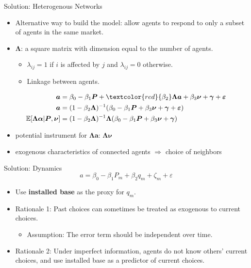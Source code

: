 \documentclass[aspectratio=169]{beamer}  %
\begin{document}
\begin{frame}{Solution: Heterogenous Networks}
    \vspace{-0.1cm}
    \begin{itemize}
        \item Alternative way to build the model: allow agents to respond to only a subset of agents in the same market.
        \item $\bm{\Lambda}$: a square matrix with dimension equal to
        the number of agents.
        \begin{itemize}
            \item $\lambda_{ij}= 1$ if $i$ is affected by $j$ and $\lambda_{ij}= 0$ otherwise.
            \item Linkage between agents.
        \end{itemize}
    \end{itemize}
    \vspace{-0.2cm}
    \begin{align*}
        \bm{a} &= \beta_0 - \beta_1 \bm{P} + \textcolor{red}{\beta_2} \bm{\Lambda} \bm{a} + \beta_3 \bm{\nu} + \bm{\gamma} + \bm{\varepsilon} \\
        \bm{a} &= (1 - \beta_2 \bm{\Lambda})^{-1} (\beta_0 - \beta_1 \bm{P} + \beta_3 \bm{\nu} + \bm{\gamma} + \bm{\varepsilon}) \\
        \mathbb{E}[\bm{\Lambda} \bm{\alpha} | \bm{P}, \bm{\nu}] &= (1 - \beta_2 \bm{\Lambda})^{-1} \bm{\Lambda} (\beta_0 - \beta_1 \bm{P} + \beta_3 \bm{\nu} + \bm{\gamma})
    \end{align*}
    \vspace{-0.3cm}
    \begin{itemize}
        \item potential instrument for $\bm{\Lambda}\bm{a}$: $\bm{\Lambda}\bm{\nu}$
        \item exogenous characteristics of connected agents $\Rightarrow$ choice of neighbors
    \end{itemize}
\end{frame}
\begin{frame}{Solution: Dynamics}
    $$ a = \beta_0 - \beta_1P_m + \beta_2q_m + \zeta_m + \varepsilon $$
    \begin{itemize}
        \item Use \textbf{installed base} as the proxy for $q_m$.
        \item Rationale 1: Past choices can sometimes be treated as exogenous to current choices.
        \begin{itemize}
            \item Assumption: The error term should be independent over time.
        \end{itemize}
        \item Rationale 2: Under imperfect information, agents do not know others' current choices, and use installed base as a predictor of current choices.
    \end{itemize}
\end{frame}
\end{document}
